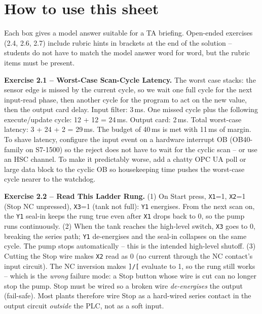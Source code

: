 \documentclass[11pt,a4paper]{article}
\begin{document}
\sheetheader

\section*{How to use this sheet}
Each box gives a model answer suitable for a TA briefing. Open-ended
exercises (2.4, 2.6, 2.7) include rubric hints in brackets at the end of
the solution -- students do not have to match the model answer word for
word, but the rubric items must be present.

\begin{solutionbox}
\textbf{Exercise 2.1 -- Worst-Case Scan-Cycle Latency.}
The worst case stacks: the sensor edge is missed by the current cycle, so
we wait one full cycle for the next input-read phase, then another cycle
for the program to act on the new value, then the output card delay.
Input filter: 3\,ms. One missed cycle plus the
following execute/update cycle: 12 + 12 = 24\,ms.
Output card: 2\,ms. Total worst-case
latency: 3 + 24 + 2 = 29\,ms. The
budget of 40\,ms is met with 11\,ms of margin. To
shave latency, configure the input event on a hardware interrupt OB
(OB40-family on S7-1500) so the reject does not have to wait for the
cyclic scan -- or use an HSC channel. To make it predictably worse, add a
chatty OPC UA poll or large data block to the cyclic OB so housekeeping
time pushes the worst-case cycle nearer to the watchdog.
\end{solutionbox}

\begin{solutionbox}
\textbf{Exercise 2.2 -- Read This Ladder Rung.}
(1) On Start press, \texttt{X1}=1, \texttt{X2}=1 (Stop NC unpressed),
\texttt{X3}=1 (tank not full): \texttt{Y1} energises. From the next scan
on, the \texttt{Y1} seal-in keeps the rung true even after \texttt{X1}
drops back to 0, so the pump runs continuously.
(2) When the tank reaches the high-level switch, \texttt{X3} goes to 0,
breaking the series path; \texttt{Y1} de-energises and the seal-in
collapses on the same cycle. The pump stops automatically -- this is the
intended high-level shutoff.
(3) Cutting the Stop wire makes \texttt{X2} read as 0 (no current through
the NC contact's input circuit). The NC inversion makes \texttt{]/[}
evaluate to 1, so the rung still works -- which is the \emph{wrong}
failure mode: a Stop button whose wire is cut can no longer stop the
pump. Stop must be wired so a broken wire \emph{de-energises} the output
(fail-safe). Most plants therefore wire Stop as a hard-wired series
contact in the output circuit \emph{outside} the PLC, not as a soft input.
\end{solutionbox}
\end{document}
